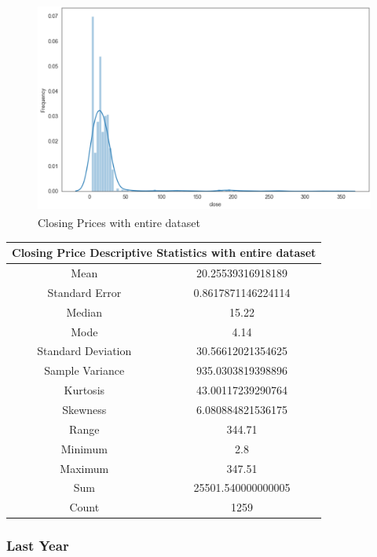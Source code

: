\begin{figure}[h!]
\centering
\includegraphics[width=15cm,height=7cm,keepaspectratio]{resultsEvaluation/closeDescMax.png}
\caption{Closing Prices with entire dataset}
\label{fig:appendix_closeDescMax}
\end{figure}
\begin{center}
\begin{tabular}{ c c }
\hline
\multicolumn{2}{|c|}{Closing Price Descriptive Statistics with entire dataset} \\
\hline
Mean & 20.25539316918189 \\
Standard Error & 0.8617871146224114 \\
Median & 15.22 \\
Mode & 4.14 \\
Standard Deviation & 30.56612021354625 \\
Sample Variance & 935.0303819398896 \\
Kurtosis & 43.00117239290764 \\
Skewness & 6.080884821536175 \\
Range & 344.71 \\
Minimum & 2.8 \\
Maximum & 347.51 \\
Sum & 25501.540000000005 \\
Count & 1259  
\end{tabular}
\end{center}

\subsubsection{Last Year}

